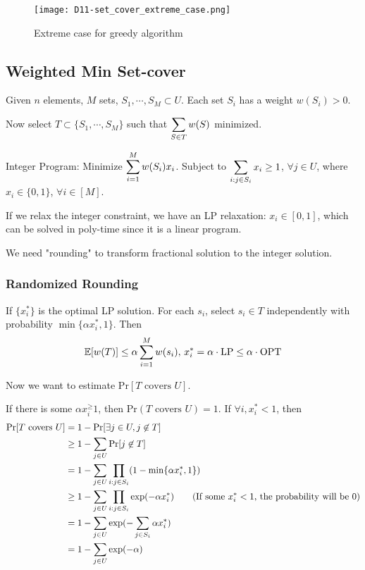 \begin{figure}[htbp]
    \centering
    \texttt{[image: D11-set\_cover\_extreme\_case.png]}
    \caption{Extreme case for greedy algorithm}
\end{figure}
\subsection{Weighted Min Set-cover}
\begin{example}
    Given  $ n $ elements,  $ M $ sets,  $ S_1,\cdots,S_M\subset U $. Each set  $ S_i $ has a weight  $ w(S_i)>0 $.

    Now select  $ T\subset\{S_1,\cdots, S_M\} $ such that  $ \displaystyle\sum_{S\in T}w(S) $ minimized. 
\end{example}
Integer Program: Minimize  $ \displaystyle\sum_{i=1}^M w(S_i)x_i $. Subject to   $ \displaystyle\sum_{i:j\in S_i} x_i \geq 1$,  $ \forall j\in U $, where  $ x_i\in \{0,1\} $,  $ \forall i\in [M] $.

If we relax the integer constraint, we have an LP relaxation:  $ x_i\in[0,1] $, which can be solved in poly-time since it is a linear program.

We need "rounding" to transform fractional solution to the integer solution.

\subsubsection{Randomized Rounding}
If  $ \{x_i^*\} $ is the optimal LP solution.  For each  $ s_i $, select  $ s_i\in T $ independently with probability   $ \min\{\alpha x_i^*,1\} $. Then 
\[\mathbb E[w(T)] \leq \alpha\sum_{i=1}^M w(s_i),\,x_i^*=\alpha\cdot \mathrm{LP} \leq \alpha\cdot \mathrm{OPT}\] 

Now we want to estimate  $ \mathrm{Pr}[T\text{ covers }U] $.

If there is some  $ \alpha x_i^ \geq 1 $, then  $ \mathrm{Pr}(T\text{ covers }U)=1 $. If  $ \forall i, x_i^*<1 $,   
then 
\[\begin{aligned}
    \mathrm{Pr}[T\text{ covers }U]&=1-\mathrm{Pr}[ \exists j\in U , j\not\in T ]\\
    & \geq 1-\sum_{j\in U}\mathrm{Pr}[j\not\in T]\\
    &=1-\sum_{j\in U}\prod_{i: j\in S_i}(1-\min\{\alpha x_i^*,1\})\\
    & \geq 1-\sum_{j\in U}\prod_{i: j\in S_i}\exp(-\alpha x_i^*)\qquad\text{(If some $ x_i^*<1 $, the probability will be 0)}\\
    &=1-\sum_{j\in U}\exp(-\sum_{j\in S_i}\alpha x_i^*)\\
    &=1-\sum_{j\in U}\exp(-\alpha)
\end{aligned}\]

